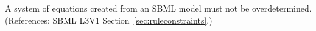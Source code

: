 A system of equations created from an SBML model must not be
overdetermined.  (References: SBML L3V1 Section~\ref{sec:ruleconstraints}.)
